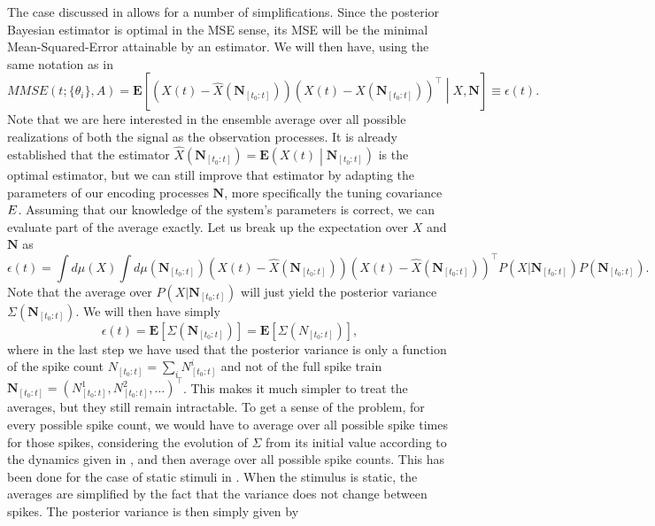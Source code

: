 The case discussed in  allows for a number of simplifications. Since the posterior Bayesian estimator is optimal in the MSE sense, its MSE will be the minimal Mean-Squared-Error attainable by an estimator. We will then have, using the same notation as in 
\[
MMSE(t;\{\theta_i\},A) = \boldsymbol{E}\left[\left(X(t) - \hat{X}(\boldsymbol{N}_{[t_0:t]})\right)\left(X(t) - \hat{X}(\boldsymbol{N}_{[t_0:t]})\right)^\top\middle| X, \boldsymbol{N}\right]\equiv \epsilon(t).
\]
Note that we are here interested in the ensemble average over all possible realizations of both the signal as the observation processes. It is already established that the estimator $\hat{X}(\boldsymbol{N}_{[t_0:t]}) = \boldsymbol{E}\left(X(t)\middle|\boldsymbol{N}_{[t_0:t]}\right)$ is the optimal estimator, but we can still improve that estimator by adapting the parameters of our encoding processes $\boldsymbol{N}$, more specifically the tuning covariance $E$. Assuming that our knowledge of the system's parameters is correct, we can evaluate part of the average exactly. Let us break up the expectation over $X$ and $\boldsymbol{N}$ as
\[
\epsilon(t) = \int d\mu(X) \int d\mu(\boldsymbol{N}_{[t_0:t]}) \left(X(t) - \hat{X}(\boldsymbol{N}_{[t_0:t]})\right)\left(X(t) - \hat{X}(\boldsymbol{N}_{[t_0:t]})\right)^\top P(X| \boldsymbol{N}_{[t_0:t]}) P(\boldsymbol{N}_{[t_0:t]}).
\]
Note that the average over $P(X|\boldsymbol{N}_{[t_0:t]})$ will just yield the posterior variance $\Sigma(\boldsymbol{N}_{[t_0:t]})$. We will then have simply
\[
\epsilon(t) = \boldsymbol{E}\left[\Sigma(\boldsymbol{N}_{[t_0:t]})\right] = \boldsymbol{E}\left[\Sigma(N_{[t_0:t]})\right],
\]
where in the last step we have used that the posterior variance is only a function of the spike count $N_{[t_0:t]} = \sum_i N^i_{[t_0:t]}$ and not of the full spike train $\boldsymbol{N}_{[t_0:t]} = \left(N^1_{[t_0:t]}, N^2_{[t_0:t]}, \ldots\right)^\top$. This makes it much simpler to treat the averages, but they still remain intractable. To get a sense of the problem, for every possible spike count, we would have to average over all possible spike times for those spikes, considering the evolution of $\Sigma$ from its initial value according to the dynamics given in , and then average over all possible spike counts. This has been done for the case of static stimuli in \citet{Yaeli2010}. When the stimulus is static, the averages are simplified by the fact that the variance does not change between spikes. The posterior variance is then simply given by
